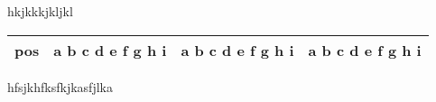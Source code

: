 \documentclass{ctexart}
\begin{document}
    
\begin{table}[t]
hkjkkkjkljkl  \par
    \newcommand\txt %
    {a b c d e f g h i}
    \begin{tabular}{cp{2em}m{2em}b{2em}}
        \hline
        pos & \txt & \txt & \txt \\
        \hline
    \end{tabular}


    
hfsjkhfksfkjkasfjlka \par

\end{table}
\end{document}
